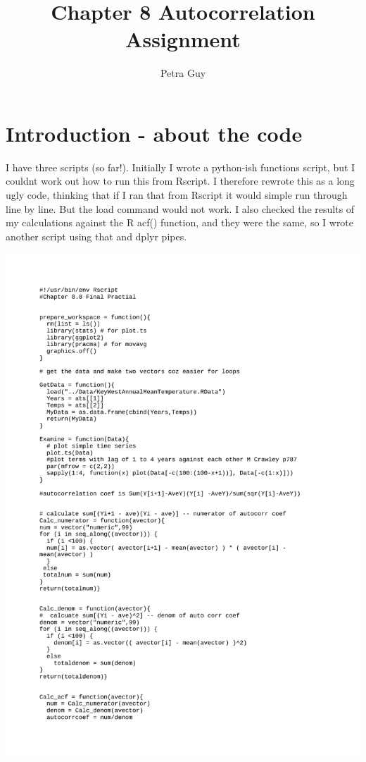 \documentclass[a4paper]{article}
\title{Chapter 8 Autocorrelation Assignment}
\author{Petra Guy}
\begin{document}
\maketitle

\section{Introduction - about the code}
I have three scripts (so far!). Initially I wrote a python-ish functions script, 
but I couldnt work out how to run this from Rscript.
I therefore rewrote this as a long ugly code, thinking that if I ran that
from Rscript it would simple run through line by line. But the 
load command would not work. I also checked the results of my 
calculations against the R acf() function, and they were the same, 
so I wrote another script using that and dplyr pipes.

\begin{minipage}{\linewidth}
\begin{center}
\includegraphics[width=.5\linewidth]{AutoCorr2.pdf}
\end{center}
\end{minipage}
\end{document}
